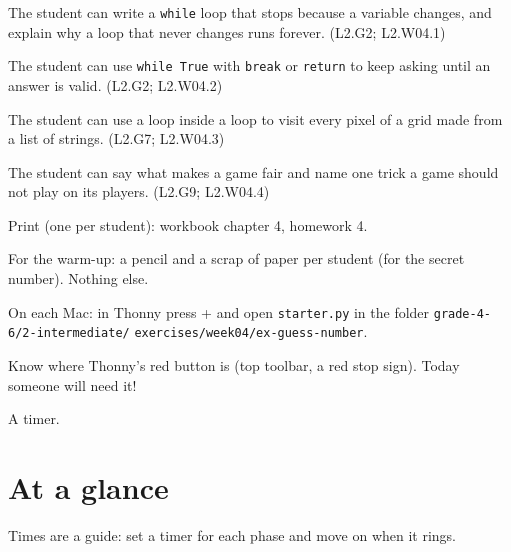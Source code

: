 
\begin{objectives}
  \item The student can write a \texttt{while} loop that stops because a variable changes, and explain why a loop that never changes runs forever. (L2.G2; L2.W04.1)
  \item The student can use \texttt{while True} with \texttt{break} or \texttt{return} to keep asking until an answer is valid. (L2.G2; L2.W04.2)
  \item The student can use a loop inside a loop to visit every pixel of a grid made from a list of strings. (L2.G7; L2.W04.3)
  \item The student can say what makes a game fair and name one trick a game should not play on its players. (L2.G9; L2.W04.4)
\end{objectives}

\begin{materials}
  \item Print (one per student): workbook chapter 4, homework 4.
  \item For the warm-up: a pencil and a scrap of paper per student (for the secret number). Nothing else.
  \item On each Mac: in Thonny press + and open \texttt{starter.py} in the folder \texttt{grade-4-6/2-intermediate/} \texttt{exercises/week04/ex-guess-number}.
  \item Know where Thonny's red  button is (top toolbar, a red stop sign). Today someone will need it!
  \item A timer.
\end{materials}

\section{At a glance}
Times are a guide: set a timer for each phase and move on when it rings.
\begin{timeplan}
\end{timeplan}


